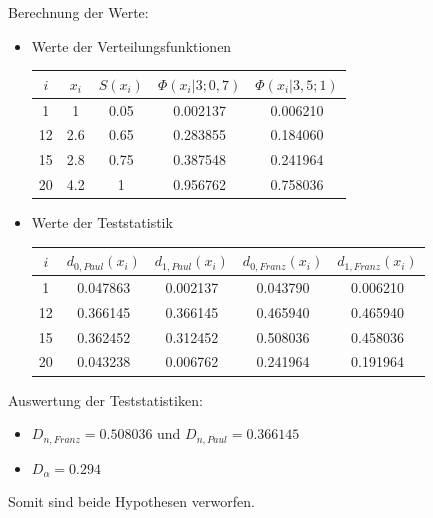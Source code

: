 \documentclass{beamer}
\begin{document}
\begin{frame}{\insertsubsection}
Berechnung der Werte:\\
	\begin{itemize}
		\item Werte der Verteilungsfunktionen
			\begin{table}[ht]
			\center
			\begin{tabular}{c|c|c|c|c}
			$i$ 	& $x_i$ 	& $S(x_i)$ 	& $\Phi (x_i|3;0,7)$ 	& $\Phi (x_i|3,5;1)$ 	\\
			\hline
			1	&	1	&	0.05	&	0.002137	&	0.006210	\\
			12	&	2.6	&	0.65	&	0.283855	&	0.184060	\\
			15	&	2.8	&	0.75	&	0.387548	&	0.241964	\\
			20	&	4.2	&	1	&	0.956762	&	0.758036	\\
			\end{tabular}
			\end{table}
		\item Werte der Teststatistik
			\begin{table}[ht]
			\center
			\begin{tabular}{c|c|c|c|c}
			$i$ 	& $d_{0,Paul}(x_i)$ 	& $d_{1,Paul}(x_i)$ 	& $d_{0,Franz}(x_i)$ 	& $d_{1,Franz}(x_i)$ 	\\
			\hline
			1	&	0.047863	&	0.002137	&	0.043790	&	0.006210	\\
			12	&	0.366145	&	0.366145	&	0.465940	&	0.465940	\\
			15	&	0.362452	&	0.312452	&	0.508036	&	0.458036	\\
			20	&	0.043238	&	0.006762	&	0.241964	&	0.191964	\\
			\end{tabular}
			\end{table}
	\end{itemize}
\end{frame}

\begin{frame}{\insertsubsection}
Auswertung der Teststatistiken:\\
	\begin{itemize}
		\item $D_{n,Franz}=0.508036$ und $D_{n,Paul}=0.366145$
		\item $D_\alpha=0.294$
	\end{itemize}
Somit sind beide Hypothesen verworfen.
\end{frame}

\end{document}
